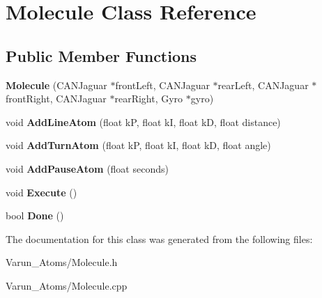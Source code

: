\hypertarget{class_molecule}{\section{Molecule Class Reference}
\label{class_molecule}
}
\subsection*{Public Member Functions}
\begin{DoxyCompactItemize}
\item 
\hypertarget{class_molecule_a90df5c5155c83ac1c3c2d7a52f733ede}{{\bfseries Molecule} (C\-A\-N\-Jaguar $\ast$front\-Left, C\-A\-N\-Jaguar $\ast$rear\-Left, C\-A\-N\-Jaguar $\ast$front\-Right, C\-A\-N\-Jaguar $\ast$rear\-Right, Gyro $\ast$gyro)}\label{class_molecule_a90df5c5155c83ac1c3c2d7a52f733ede}

\item 
\hypertarget{class_molecule_a859c25bb06ca6ad8a51dd63dab9a65f8}{void {\bfseries Add\-Line\-Atom} (float k\-P, float k\-I, float k\-D, float distance)}\label{class_molecule_a859c25bb06ca6ad8a51dd63dab9a65f8}

\item 
\hypertarget{class_molecule_a26a113923a688697923d32d8fd68676e}{void {\bfseries Add\-Turn\-Atom} (float k\-P, float k\-I, float k\-D, float angle)}\label{class_molecule_a26a113923a688697923d32d8fd68676e}

\item 
\hypertarget{class_molecule_a13d4f6b203fe789f6b0f00c691915d7f}{void {\bfseries Add\-Pause\-Atom} (float seconds)}\label{class_molecule_a13d4f6b203fe789f6b0f00c691915d7f}

\item 
\hypertarget{class_molecule_ae651169ec7e2da3f3108e7539c473554}{void {\bfseries Execute} ()}\label{class_molecule_ae651169ec7e2da3f3108e7539c473554}

\item 
\hypertarget{class_molecule_a2e6a136a2ffa52fb3b77e8cfa12cdad6}{bool {\bfseries Done} ()}\label{class_molecule_a2e6a136a2ffa52fb3b77e8cfa12cdad6}

\end{DoxyCompactItemize}


The documentation for this class was generated from the following files\-:\begin{DoxyCompactItemize}
\item 
Varun\-\_\-\-Atoms/Molecule.\-h\item 
Varun\-\_\-\-Atoms/Molecule.\-cpp\end{DoxyCompactItemize}
